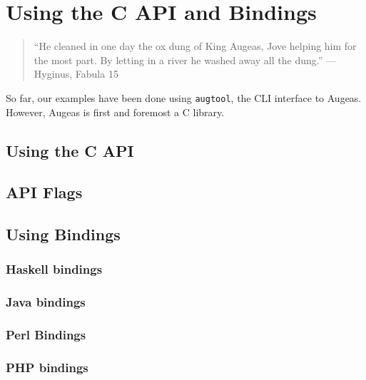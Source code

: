 \chapter{Using the C API and Bindings}

 

\begin{quote}
``He cleaned in one day the ox dung of King Augeas, Jove helping him for the most part. By letting in a river he washed away all the dung.'' --- Hyginus, Fabula 15

\end{quote}
So far, our examples have been done using \verb!augtool!, the CLI interface to Augeas. However, Augeas is first and foremost a C library.

\section{Using the C API}


\section{API Flags}

 

\section{Using Bindings}


\subsection{Haskell bindings}


\subsection{Java bindings}


\subsection{Perl Bindings}


\subsection{PHP bindings}

